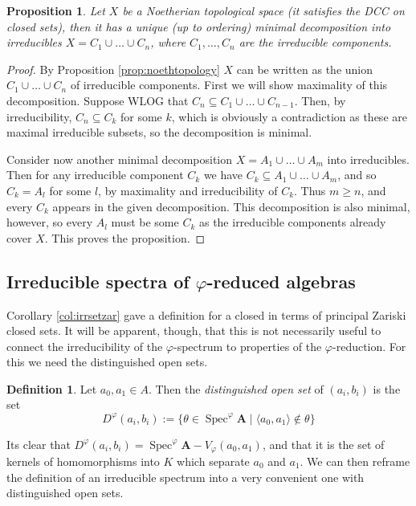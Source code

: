 \documentclass{article}
\theoremstyle{plain}
\newtheorem{proposition}[theorem]{Proposition}
\theoremstyle{definition}
\newtheorem{definition}{Definition}[section]
\newcommand{\Spec}{\operatorname{Spec}}
\begin{document}
\begin{proposition} \label{prop:uniqueirrdec}
    Let $X$ be a Noetherian topological space (it satisfies the DCC on closed sets), then it has a unique (up to ordering) minimal decomposition into irreducibles $X = C_1 \cup \dots \cup C_n$, where $C_1, \dots, C_n$ are the irreducible components.
\end{proposition}
\begin{proof}
    By Proposition \ref{prop:noethtopology} $X$ can be written as the union $C_1 \cup \dots \cup C_n$ of irreducible components.
    First we will show maximality of this decomposition.
    Suppose WLOG that $C_n \subseteq C_1 \cup \dots \cup C_{n-1}$.
    Then, by irreducibility, $C_n \subseteq C_k$ for some $k$, which is obviously a contradiction as these are maximal irreducible subsets, so the decomposition is minimal.\par
    Consider now another minimal decomposition $X = A_1 \cup \dots \cup A_m$ into irreducibles. Then for any irreducible component $C_k$ we have $C_k \subseteq A_1 \cup \dots \cup A_m$, and so $C_k = A_l$ for some $l$, by maximality and irreducibility of $C_k$.
    Thus $m \geq n$, and every $C_k$ appears in the given decomposition. 
    This decomposition is also minimal, however, so every $A_l$ must be some $C_k$ as the irreducible components already cover $X$.
    This proves the proposition.
\end{proof}


\subsection{Irreducible spectra of $\varphi$-reduced algebras}

Corollary \ref{col:irrsetzar} gave a definition for a closed in terms of principal Zariski closed sets.
It will be apparent, though, that this is not necessarily useful to connect the irreducibility of the $\varphi$-spectrum to properties of the $\varphi$-reduction.
For this we need the distinguished open sets.

\begin{definition}
    Let $a_0, a_1 \in A$.
    Then the \textit{distinguished open set} of $(a_i, b_i)$ is the set
    $$D^\varphi(a_i, b_i) := \{ \theta \in \Spec^\varphi\mathbf{A} \mid \langle a_0, a_1\rangle \notin \theta \}$$
\end{definition}

Its clear that $D^\varphi(a_i, b_i) = \Spec^\varphi\mathbf{A} - V_\varphi(a_0, a_1)$, and that it is the set of kernels of homomorphisms into $K$ which separate $a_0$ and $a_1$.
We can then reframe the definition of an irreducible spectrum into a very convenient one with distinguished open sets.
\end{document}
